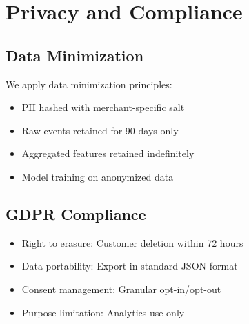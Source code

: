 \section{Privacy and Compliance}


\subsection{Data Minimization}

We apply data minimization principles:

\begin{itemize}
    \item PII hashed with merchant-specific salt
    \item Raw events retained for 90 days only
    \item Aggregated features retained indefinitely
    \item Model training on anonymized data
\end{itemize}

\subsection{GDPR Compliance}

\begin{itemize}
    \item Right to erasure: Customer deletion within 72 hours
    \item Data portability: Export in standard JSON format
    \item Consent management: Granular opt-in/opt-out
    \item Purpose limitation: Analytics use only
\end{itemize}

